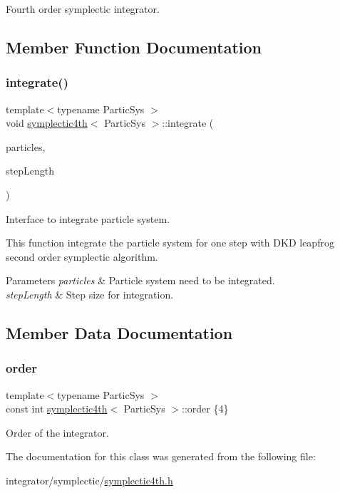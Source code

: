 Fourth order symplectic integrator. 

\subsection{Member Function Documentation}
\mbox{\label{classsymplectic4th_aa4fc1444804ed2effb0033a3cb5056e4}} 
\subsubsection{\texorpdfstring{integrate()}{integrate()}}
{\footnotesize\ttfamily template$<$typename Partic\+Sys $>$ \\
void \mbox{\hyperlink{classsymplectic4th}{symplectic4th}}$<$ Partic\+Sys $>$\+::integrate (\begin{DoxyParamCaption}\item[{Partic\+Sys \&}]{particles,  }\item[{double}]{step\+Length }\end{DoxyParamCaption})}



Interface to integrate particle system. 

This function integrate the particle system for one step with D\+KD leapfrog second order symplectic algorithm. 
\begin{DoxyParams}{Parameters}
{\em particles} & Particle system need to be integrated. \\
\hline
{\em step\+Length} & Step size for integration. \\
\hline
\end{DoxyParams}


\subsection{Member Data Documentation}
\mbox{\label{classsymplectic4th_a44427b7e9dab1a2241071d1cc639ebe4}} 
\subsubsection{\texorpdfstring{order}{order}}
{\footnotesize\ttfamily template$<$typename Partic\+Sys $>$ \\
const int \mbox{\hyperlink{classsymplectic4th}{symplectic4th}}$<$ Partic\+Sys $>$\+::order \{4\}\hspace{0.3cm}{\ttfamily [static]}}



Order of the integrator. 



The documentation for this class was generated from the following file\+:\begin{DoxyCompactItemize}
\item 
integrator/symplectic/\mbox{\hyperlink{symplectic4th_8h}{symplectic4th.\+h}}\end{DoxyCompactItemize}
